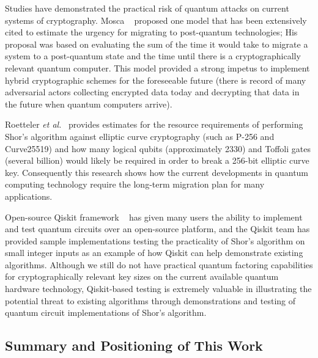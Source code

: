 \documentclass{ieeeaccess}
\begin{document}
Studies have demonstrated the practical risk of quantum attacks on current systems of cryptography. Mosca ~\cite{mosca2018} proposed one model that has been extensively cited to estimate the urgency for migrating to post-quantum technologies; His proposal was based on evaluating the sum of the time it would take to migrate a system to a post-quantum state and the time until there is a cryptographically relevant quantum computer. This model provided a strong impetus to implement hybrid cryptographic schemes for the foreseeable future (there is record of many adversarial actors collecting encrypted data today and decrypting that data in the future when quantum computers arrive).

Roetteler \emph{et al.}~\cite{roetteler2017} provides estimates for the resource requirements of performing Shor’s algorithm against elliptic curve cryptography (such as P-256 and Curve25519) and how many logical qubits (approximately 2330) and Toffoli gates (several billion) would likely be required in order to break a 256-bit elliptic curve key. Consequently this research shows how the current developments in quantum computing technology require the long-term migration plan for many applications.

Open-source Qiskit framework ~\cite{qiskit} has given many users the ability to implement and test quantum circuits over an open-source platform, and the Qiskit team has provided sample implementations testing the practicality of Shor's algorithm on small integer inputs as an example of how Qiskit can help demonstrate existing algorithms. Although we still do not have practical quantum factoring capabilities for cryptographically relevant key sizes on the current available quantum hardware technology, Qiskit-based testing is extremely valuable in illustrating the potential threat to existing algorithms through demonstrations and testing of quantum circuit implementations of Shor's algorithm.

\subsection{Summary and Positioning of This Work}
\end{document}
